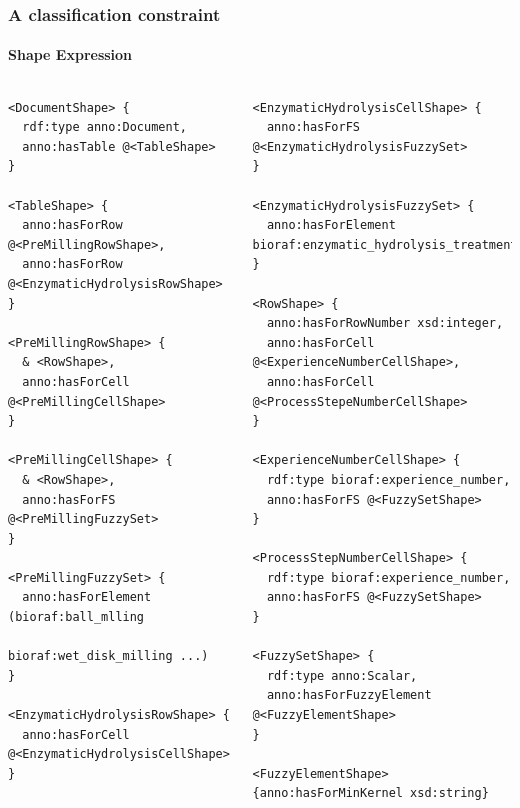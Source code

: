\documentclass{beamer}
\begin{document}
\begin{frame}[fragile]
  \frametitle{A classification constraint}
  \framesubtitle{Shape Expression}

  \begin{columns}[t]
    \begin{Verbatim}[fontsize=\tiny]
<DocumentShape> {
  rdf:type anno:Document,
  anno:hasTable @<TableShape>
}

<TableShape> {
  anno:hasForRow @<PreMillingRowShape>,
  anno:hasForRow @<EnzymaticHydrolysisRowShape>
}

<PreMillingRowShape> {
  & <RowShape>,
  anno:hasForCell @<PreMillingCellShape>
}

<PreMillingCellShape> {
  & <RowShape>,
  anno:hasForFS @<PreMillingFuzzySet>
}

<PreMillingFuzzySet> {
  anno:hasForElement (bioraf:ball_mlling
                      bioraf:wet_disk_milling ...)
}

<EnzymaticHydrolysisRowShape> {
  anno:hasForCell @<EnzymaticHydrolysisCellShape>
}
    \end{Verbatim}

    \begin{Verbatim}[fontsize=\tiny]
<EnzymaticHydrolysisCellShape> {
  anno:hasForFS @<EnzymaticHydrolysisFuzzySet>
}

<EnzymaticHydrolysisFuzzySet> {
  anno:hasForElement bioraf:enzymatic_hydrolysis_treatment
}

<RowShape> {
  anno:hasForRowNumber xsd:integer,
  anno:hasForCell @<ExperienceNumberCellShape>,
  anno:hasForCell @<ProcessStepeNumberCellShape>
}

<ExperienceNumberCellShape> {
  rdf:type bioraf:experience_number,
  anno:hasForFS @<FuzzySetShape>
}

<ProcessStepNumberCellShape> {
  rdf:type bioraf:experience_number,
  anno:hasForFS @<FuzzySetShape>
}

<FuzzySetShape> {
  rdf:type anno:Scalar,
  anno:hasForFuzzyElement @<FuzzyElementShape>
}

<FuzzyElementShape> {anno:hasForMinKernel xsd:string}
    \end{Verbatim}
  \end{columns}
\end{frame}
\end{document}
